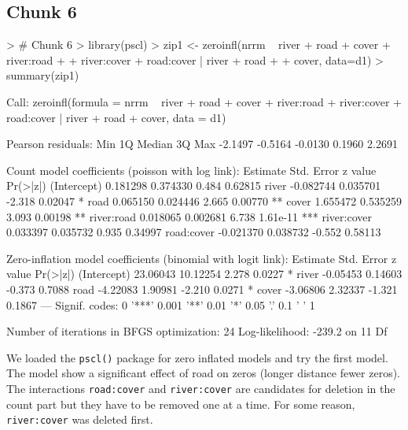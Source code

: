 \documentclass{article}
\begin{document}
\subsection{Chunk 6}
\begin{Schunk}
\begin{Sinput}
> # Chunk 6
> library(pscl)
> zip1 <- zeroinfl(nrrm ~ river + road + cover + river:road +
+                    river:cover + road:cover | river + road +
+                    cover, data=d1)
> summary(zip1)
\end{Sinput}
\begin{Soutput}
Call:
zeroinfl(formula = nrrm ~ river + road + cover + river:road + river:cover + 
    road:cover | river + road + cover, data = d1)

Pearson residuals:
    Min      1Q  Median      3Q     Max 
-2.1497 -0.5164 -0.0130  0.1960  2.2691 

Count model coefficients (poisson with log link):
             Estimate Std. Error z value Pr(>|z|)    
(Intercept)  0.181298   0.374330   0.484  0.62815    
river       -0.082744   0.035701  -2.318  0.02047 *  
road         0.065150   0.024446   2.665  0.00770 ** 
cover        1.655472   0.535259   3.093  0.00198 ** 
river:road   0.018065   0.002681   6.738 1.61e-11 ***
river:cover  0.033397   0.035732   0.935  0.34997    
road:cover  -0.021370   0.038732  -0.552  0.58113    

Zero-inflation model coefficients (binomial with logit link):
            Estimate Std. Error z value Pr(>|z|)  
(Intercept) 23.06043   10.12254   2.278   0.0227 *
river       -0.05453    0.14603  -0.373   0.7088  
road        -4.22083    1.90981  -2.210   0.0271 *
cover       -3.06806    2.32337  -1.321   0.1867  
---
Signif. codes:  0 '***' 0.001 '**' 0.01 '*' 0.05 '.' 0.1 ' ' 1 

Number of iterations in BFGS optimization: 24 
Log-likelihood: -239.2 on 11 Df
\end{Soutput}
\end{Schunk}

We loaded the \verb!pscl()! package for zero inflated models and try the first model. The model show a significant effect of road on zeros (longer distance fewer zeros). The interactions \verb!road:cover! and \verb!river:cover! are candidates for deletion in the count part but they have to be removed one at a time. For some reason, \verb!river:cover! was deleted first.
\end{document}
